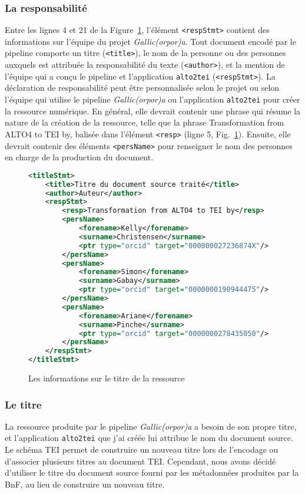 \documentclass[class=article, crop=false]{standalone}
\begin{document}
\subsubsection{La responsabilité}
Entre les lignes 4 et 21 de la Figure~\ref{fig:titleStmt1}, l'élément \texttt{<respStmt>} contient des informations sur l'équipe du projet \textit{Gallic(orpor)a}. Tout document encodé par le pipeline comporte un titre (\texttt{<title>}), le nom de la  personne ou des personnes auxquels est attribuée la responsabilité du texte (\texttt{<author>}), et la mention de l'équipe qui a conçu le pipeline et l'application \texttt{alto2tei} (\texttt{<respStmt>}). La déclaration de responsabilité peut être personnalisée selon le projet ou selon l'équipe qui utilise le pipeline \textit{Gallic(orpor)a} ou l'application \texttt{alto2tei} pour créer la ressource numérique. En général, elle devrait contenir une phrase qui résume la nature de la création de la ressource, telle que la phrase \og{}Transformation from ALTO4 to TEI by\fg{}, balisée dans l'élément \texttt{<resp>} (ligne 5, Fig.~\ref{fig:titleStmt1}). Ensuite, elle devrait contenir des éléments \texttt{<persName>} pour renseigner le nom des personnes en charge de la production du document.

\begin{figure}[htp]
\centering
\begin{lstlisting}[language=XML]
<titleStmt>
	<title>Titre du document source traité</title>
	<author>Auteur</author>
	<respStmt>
		<resp>Transformation from ALTO4 to TEI by</resp>
		<persName>
			<forename>Kelly</forename>
			<surname>Christensen</surname>
			<ptr type="orcid" target="000000027236874X"/>
		</persName>
		<persName>
			<forename>Simon</forename>
			<surname>Gabay</surname>
			<ptr type="orcid" target="0000000190944475"/>
		</persName>
		<persName>
			<forename>Ariane</forename>
			<surname>Pinche</surname>
			<ptr type="orcid" target="0000000278435050"/>
		</persName>
	</respStmt>
</titleStmt>
\end{lstlisting}
\caption{Les informations sur le titre de la ressource}
\label{fig:titleStmt1}
\end{figure}

\subsubsection{Le titre}
La ressource produite par le pipeline \textit{Gallic(orpor)a} a besoin de son propre titre, et l'application \texttt{alto2tei} que j'ai créée lui attribue le nom du document source. Le schéma \acrshort{TEI} permet de construire un nouveau titre lors de l'encodage ou d'associer plusieurs titres au document \acrshort{TEI}. Cependant, nous avons décidé d'utiliser le titre du document source fourni par les métadonnées produites par la BnF, au lieu de construire un nouveau titre.
\end{document}
